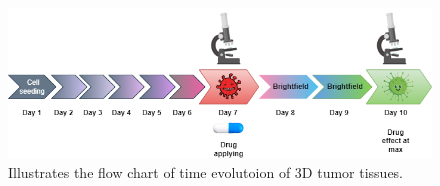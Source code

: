 \begin{figure}[H]
  \centering
  \includegraphics[scale=0.7]{figures/timed.png} 
  \caption{Illustrates the flow chart of time evolutoion of 3D tumor tissues.}
  \label{fig:time}
\end{figure}
\let\cleardoublepage\clearpage


